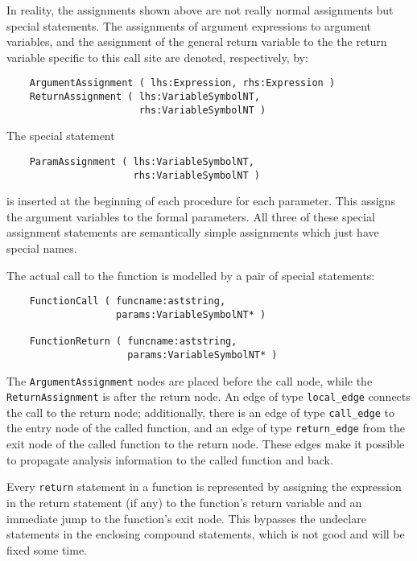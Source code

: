 
In reality, the assignments shown above are not really normal
assignments but special statements. The assignments of argument
expressions to argument variables, and the assignment of the general
return variable to the the return variable specific to this call
site are denoted, respectively, by:
\begin{verbatim}
    ArgumentAssignment ( lhs:Expression, rhs:Expression )
    ReturnAssignment ( lhs:VariableSymbolNT,
                       rhs:VariableSymbolNT )
\end{verbatim}

The special statement
\begin{verbatim}
    ParamAssignment ( lhs:VariableSymbolNT,
                      rhs:VariableSymbolNT )
\end{verbatim}
is inserted at the beginning of each procedure for each parameter.
This assigns the argument variables to the formal parameters. All
three of these special assignment statements are semantically simple
assignments which just have special names.

The actual call to the function is modelled by a pair of special
statements:
\begin{verbatim}
    FunctionCall ( funcname:aststring, 
                   params:VariableSymbolNT* )

    FunctionReturn ( funcname:aststring, 
                     params:VariableSymbolNT* )
\end{verbatim}
The \verb|ArgumentAssignment| nodes are placed before the call node,
while the \verb|ReturnAssignment| is after the return node. An edge
of type \verb|local_edge| connects the call to the return node;
additionally, there is an edge of type \verb|call_edge| to the entry
node of the called function, and an edge of type \verb|return_edge|
from the exit node of the called function to the return node. These
edges make it possible to propagate analysis information to the
called function and back.

Every \lstinline|return| statement in a function is represented by
assigning the expression in the return statement (if any) to the
function's return variable and an immediate jump to the function's
exit node. This bypasses the undeclare statements in the enclosing
compound statements, which is not good and will be fixed some time.

